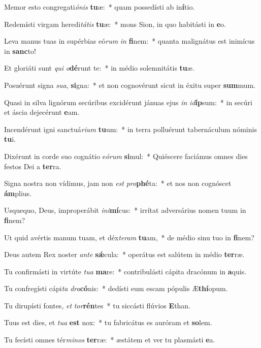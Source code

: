 \item Memor esto congregati\textit{ó}\textit{nis} \textbf{tu}æ:~* quam possedísti ab in\textbf{í}tio.
\item Redemísti virgam heredi\textit{tá}\textit{tis} \textbf{tu}æ:~* mons Sion, in quo habitásti in \textbf{e}o.
\item Leva manus tuas in supérbias eó\textit{rum} \textit{in} \textbf{fi}nem:~* quanta malignátus est inimícus in \textbf{sanc}to!
\item Et gloriáti sunt \textit{qui} \textit{o}\textbf{dé}runt te:~* in médio solemnitátis \textbf{tu}æ.
\item Posuérunt signa \textit{su}\textit{a}, \textbf{si}gna:~* et non cognovérunt sicut in éxitu super \textbf{sum}mum.
\item Quasi in silva lignórum secúribus excidérunt jánuas ejus \textit{in} \textit{id}\textbf{íp}sum:~* in secúri et áscia dejecérunt \textbf{e}am.
\item Incendérunt igni sanctuá\textit{ri}\textit{um} \textbf{tu}um:~* in terra polluérunt tabernáculum nóminis \textbf{tu}i.
\item Dixérunt in corde suo cognátio e\textit{ó}\textit{rum} \textbf{si}mul:~* Quiéscere faciámus omnes dies festos Dei a \textbf{ter}ra.
\item Signa nostra non vídimus, jam non \textit{est} \textit{pro}\textbf{phé}ta:~* et nos non cognóscet \textbf{ám}plius.
\item Usquequo, Deus, improperábit \textit{in}\textit{i}\textbf{mí}cus:~* irrítat adversárius nomen tuum in \textbf{fi}nem?
\item Ut quid avértis manum tuam, et déx\textit{te}\textit{ram} \textbf{tu}am,~* de médio sinu tuo in \textbf{fi}nem?
\item Deus autem Rex noster \textit{an}\textit{te} \textbf{sǽ}cula:~* operátus est salútem in médio \textbf{ter}ræ.
\item Tu confirmásti in virtúte \textit{tu}\textit{a} \textbf{ma}re:~* contribulásti cápita dracónum in \textbf{a}quis.
\item Tu confregísti cápi\textit{ta} \textit{dra}\textbf{có}nis:~* dedísti eum escam pópulis Æ\textbf{thí}opum.
\item Tu dirupísti fontes, \textit{et} \textit{tor}\textbf{rén}tes~* tu siccásti flúvios \textbf{E}than.
\item Tuus est dies, et \textit{tu}\textit{a} \textbf{est} nox:~* tu fabricátus es auróram et \textbf{so}lem.
\item Tu fecísti omnes tér\textit{mi}\textit{nos} \textbf{ter}ræ:~* æstátem et ver tu plasmásti \textbf{e}a.
